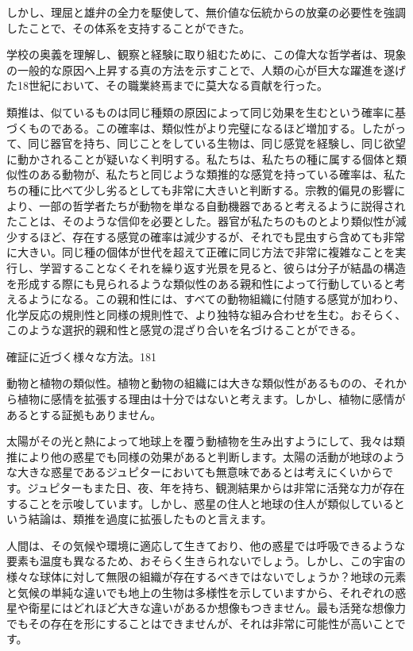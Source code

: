 \documentclass[a4paper,11pt,openany]{ltjsbook}
\begin{document}
しかし、理屈と雄弁の全力を駆使して、無价値な伝統からの放棄の必要性を強調したことで、その体系を支持することができた。

学校の奥義を理解し、観察と経験に取り組むために、この偉大な哲学者は、現象の一般的な原因へ上昇する真の方法を示すことで、人類の心が巨大な躍進を遂げた18世紀において、その職業終焉までに莫大なる貢献を行った。

類推は、似ているものは同じ種類の原因によって同じ効果を生むという確率に基づくものである。この確率は、類似性がより完璧になるほど増加する。したがって、同じ器官を持ち、同じことをしている生物は、同じ感覚を経験し、同じ欲望に動かされることが疑いなく判明する。私たちは、私たちの種に属する個体と類似性のある動物が、私たちと同じような類推的な感覚を持っている確率は、私たちの種に比べて少し劣るとしても非常に大きいと判断する。宗教的偏見の影響により、一部の哲学者たちが動物を単なる自動機器であると考えるように説得されたことは、そのような信仰を必要とした。器官が私たちのものとより類似性が減少するほど、存在する感覚の確率は減少するが、それでも昆虫すら含めても非常に大きい。同じ種の個体が世代を超えて正確に同じ方法で非常に複雑なことを実行し、学習することなくそれを繰り返す光景を見ると、彼らは分子が結晶の構造を形成する際にも見られるような類似性のある親和性によって行動していると考えるようになる。この親和性には、すべての動物組織に付随する感覚が加わり、化学反応の規則性と同様の規則性で、より独特な組み合わせを生む。おそらく、このような選択的親和性と感覚の混ざり合いを名づけることができる。

確証に近づく様々な方法。181

動物と植物の類似性。植物と動物の組織には大きな類似性があるものの、それから植物に感情を拡張する理由は十分ではないと考えます。しかし、植物に感情があるとする証拠もありません。

太陽がその光と熱によって地球上を覆う動植物を生み出すようにして、我々は類推により他の惑星でも同様の効果があると判断します。太陽の活動が地球のような大きな惑星であるジュピターにおいても無意味であるとは考えにくいからです。ジュピターもまた日、夜、年を持ち、観測結果からは非常に活発な力が存在することを示唆しています。しかし、惑星の住人と地球の住人が類似しているという結論は、類推を過度に拡張したものと言えます。

人間は、その気候や環境に適応して生きており、他の惑星では呼吸できるような要素も温度も異なるため、おそらく生きられないでしょう。しかし、この宇宙の様々な球体に対して無限の組織が存在するべきではないでしょうか？地球の元素と気候の単純な違いでも地上の生物は多様性を示していますから、それぞれの惑星や衛星にはどれほど大きな違いがあるか想像もつきません。最も活発な想像力でもその存在を形にすることはできませんが、それは非常に可能性が高いことです。
\end{document}
